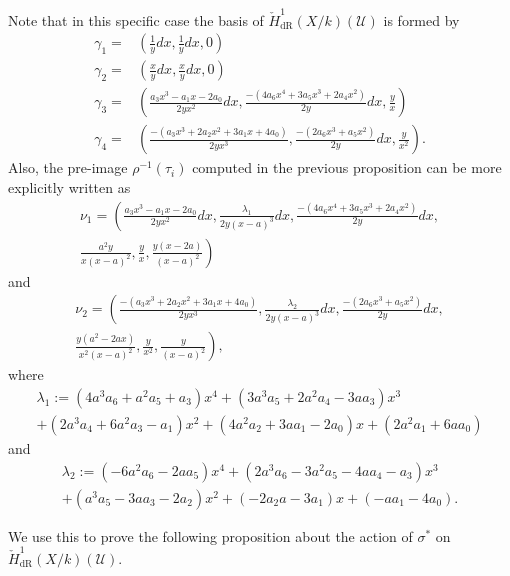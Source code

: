 \documentclass[draft, 11pt]{article} %
\theoremstyle{plain}
\theoremstyle{remark}
\newcommand{\cU}{{\mathcal U}}
\newcommand{\cechderhamhone}{\check{H}_{\text {dR}}^1(X/k)}
\begin{document}
Note that in this specific case the basis of $\cechderhamhone(\cU)$ is formed by
\begin{align*}
\gamma_1  = & \left( \frac{1}{y}dx, \frac{1}{y}dx, 0\right) \\
\gamma_2 = & \left(\frac{x}{y}dx, \frac{x}{y}dx, 0\right) \\
\gamma_3 = & \left( \frac{a_3x^3-a_1x-2a_0}{2yx^2}dx, \frac{-(4a_6x^4+3a_5x^3+2a_4x^2)}{2y}dx, \frac{y}{x} \right)\\
\gamma_4 = & \left(\frac{-(a_3x^3+2a_2x^2+3a_1x+4a_0)}{2yx^3},\frac{-(2a_6x^3+a_5x^2)}{2y}dx , \frac{y}{x^2} \right).
\end{align*}
Also, the pre-image $\rho^{-1}(\tau_i)$ computed in the previous proposition can be more explicitly written as 
\begin{multline*}
\nu_1 = \left(\frac{a_3x^3-a_1x-2a_0}{2yx^2}dx, \frac{\lambda_1}{2y(x-a)^3}dx, \frac{-(4a_6x^4+3a_5x^3+2a_4x^2)}{2y}dx,  \right. \\ \left. \frac{a^2y}{x(x-a)^2}, \frac{y}{x},  \frac{y(x-2a)}{(x-a)^2} \right)
\end{multline*}
and
\begin{multline*}
\nu_2 = \left( \frac{-(a_3x^3+2a_2x^2+3a_1x+4a_0)}{2yx^3},  \frac{\lambda_2}{2y(x-a)^3}dx, \frac{-(2a_6x^3+a_5x^2)}{2y}dx, \right. \\ \left.  \frac{y(a^2-2ax)}{x^2(x-a)^2},\frac{y}{x^2}, \frac{y}{(x-a)^2} \right),
\end{multline*}
where
\begin{multline*}
\lambda_1  := (4a^3a_6+a^2a_5+a_3)x^4 + (3a^3a_5+2a^2a_4-3aa_3)x^3 \\
 + (2a^3a_4 + 6a^2a_3 - a_1)x^2 + (4a^2a_2 +3aa_1-2a_0)x+(2a^2a_1+6aa_0)
\end{multline*}
and
\begin{multline*}
\lambda_2  := (-6a^2a_6-2aa_5)x^4 + (2a^3a_6-3a^2a_5-4aa_4-a_3)x^3 \\ + (a^3a_5-3aa_3-2a_2)x^2 + (-2a_2a-3a_1)x +(-aa_1-4a_0).
\end{multline*}

We use this to prove the following proposition about the action of $\sigma^*$ on $\cechderhamhone(\cU)$.
\end{document}
